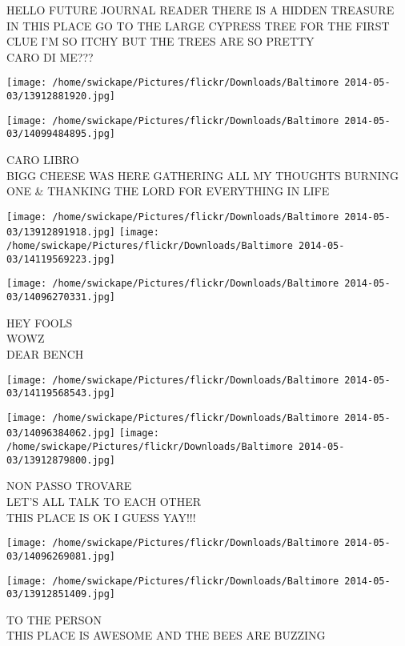 \documentclass[10pt,letterpaper]{article}
\begin{document}
HELLO FUTURE JOURNAL READER THERE IS A HIDDEN TREASURE IN THIS PLACE GO TO THE LARGE CYPRESS TREE FOR THE FIRST CLUE I'M SO ITCHY BUT THE TREES ARE SO PRETTY\\
CARO DI ME???
\pagebreak

\texttt{[image: /home/swickape/Pictures/flickr/Downloads/Baltimore 2014-05-03/13912881920.jpg]}

\vspace{0.25in}
\texttt{[image: /home/swickape/Pictures/flickr/Downloads/Baltimore 2014-05-03/14099484895.jpg]}

CARO LIBRO\\
BIGG CHEESE WAS HERE GATHERING ALL MY THOUGHTS BURNING ONE \& THANKING THE LORD FOR EVERYTHING IN LIFE
\pagebreak

\texttt{[image: /home/swickape/Pictures/flickr/Downloads/Baltimore 2014-05-03/13912891918.jpg]}
\texttt{[image: /home/swickape/Pictures/flickr/Downloads/Baltimore 2014-05-03/14119569223.jpg]}

\vspace{0.25in}
\texttt{[image: /home/swickape/Pictures/flickr/Downloads/Baltimore 2014-05-03/14096270331.jpg]}

HEY FOOLS\\
WOWZ\\
DEAR BENCH
\pagebreak

\texttt{[image: /home/swickape/Pictures/flickr/Downloads/Baltimore 2014-05-03/14119568543.jpg]}

\vspace{0.25in}
\texttt{[image: /home/swickape/Pictures/flickr/Downloads/Baltimore 2014-05-03/14096384062.jpg]}
\texttt{[image: /home/swickape/Pictures/flickr/Downloads/Baltimore 2014-05-03/13912879800.jpg]}

NON PASSO TROVARE\\
LET'S ALL TALK TO EACH OTHER\\
THIS PLACE IS OK I GUESS YAY!!!
\pagebreak

\texttt{[image: /home/swickape/Pictures/flickr/Downloads/Baltimore 2014-05-03/14096269081.jpg]}

\vspace{0.25in}
\texttt{[image: /home/swickape/Pictures/flickr/Downloads/Baltimore 2014-05-03/13912851409.jpg]}

TO THE PERSON\\
THIS PLACE IS AWESOME AND THE BEES ARE BUZZING
\pagebreak
\end{document}
